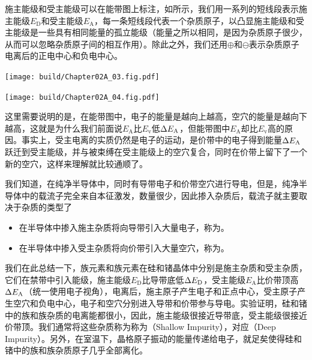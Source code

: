 施主能级和受主能级可以在能带图上标注，如所示，我们用一系列的短线段表示施主能级$E_\text{D}$和受主能级$E_\text{A}$，每一条短线段代表一个杂质原子，以凸显施主能级和受主能级是一些具有相同能量的孤立能级（能量之所以相同，是因为杂质原子很少，从而可以忽略杂质原子间的相互作用）。除此之外，我们还用$\oplus$和$\ominus$表示杂质原子电离后的正电中心和负电中心。
\begin{Figure}[施主能级和受主能级]
    \begin{FigureSub}[施主能级]
        \texttt{[image: build/Chapter02A\_03.fig.pdf]}
    \end{FigureSub}
    \hspace{1cm}
    \begin{FigureSub}[受主能级]
        \texttt{[image: build/Chapter02A\_04.fig.pdf]}
    \end{FigureSub}
\end{Figure}

这里需要说明的是，在能带图中，电子的能量是越向上越高，空穴的能量是越向下越高，这就是为什么我们前面说$E_\text{A}$比$E_\text{v}$低$\Delta{E_\text{A}}$，但能带图中$E_\text{A}$却比$E_\text{v}$高的原因。事实上，受主电离的实质仍然是电子的运动，是价带中的电子得到能量$\Delta{E_\text{A}}$跃迁到受主能级，并与被束缚在受主能级上的空穴复合，同时在价带上留下了一个新的空穴，这样来理解就比较通顺了。

我们知道，在纯净半导体中，同时有导带电子和价带空穴进行导电，但是，纯净半导体中的载流子完全来自本征激发，数量很少，因此掺入杂质后，载流子就主要取决于杂质的类型了
\begin{itemize}
    \item 在半导体中掺入施主杂质将向导带引入大量电子，称为。
    \item 在半导体中掺入受主杂质将向价带引入大量空穴，称为。
\end{itemize}

我们在此总结一下，族元素和族元素在硅和锗晶体中分别是施主杂质和受主杂质，它们在禁带中引入能级，施主能级$E_\text{D}$比导带底低$\Delta{E_\text{D}}$，受主能级$E_\text{A}$比价带顶高$\Delta{E_\text{A}}$（统一使用电子视角），电离后，施主原子产生电子和正点中心，受主原子产生空穴和负电中心，电子和空穴分别进入导带和价带参与导电。实验证明，硅和锗中的族和族杂质的电离能都很小，因此，施主能级很接近导带底，受主能级很接近价带顶。我们通常将这些杂质称为称为（Shallow Impurity），对应（Deep Impurity）。另外，在室温下，晶格原子振动的能量传递给电子，就足矣使得硅和锗中的族和族杂质原子几乎全部离化。

